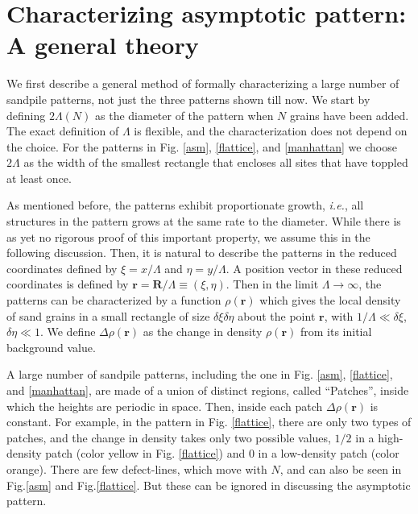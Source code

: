 \documentclass[11pt,a4paper]{book}
\begin{document}
\section{Characterizing asymptotic pattern: A general theory}
We first describe a general method of formally characterizing a
large number of sandpile patterns, not just the three patterns shown
till now.
We start by defining $2\Lambda\left( N \right)$ as the diameter of the
pattern when $N$ grains have been added. The exact definition of $\Lambda$ is flexible, and the
characterization does not depend on the choice. For the patterns in
Fig. \ref{asm}, \ref{flattice}, and \ref{manhattan} we choose $2\Lambda$ as the width of the
smallest rectangle that encloses all sites that have toppled at least
once.

As mentioned before, the patterns exhibit proportionate growth,
\textit{i.e.}, all structures in the pattern grows at the same rate to
the diameter. While there is as yet no rigorous proof of this
important property, we assume this in the following discussion. Then,
it is natural to describe the patterns in the reduced coordinates
defined by $\xi=x/\Lambda$ and $\eta=y/\Lambda$. A position
vector in these reduced coordinates is defined by $\mathbf{r}=\mathbf{R}/\Lambda\equiv\left( \xi, \eta \right)$.
Then in the limit $\Lambda\rightarrow\infty$, the patterns can be characterized by a
function $\rho(\mathbf{r})$ which gives the local density of sand
grains in a small rectangle of size $\delta\xi\delta\eta$
about the point $\mathbf{r}$, with $1/\Lambda\ll\delta\xi$, $\delta\eta\ll1$.
We define $\Delta\rho\left( \mathbf{r} \right)$ as the change in density $\rho\left( \mathbf{r} \right)$
from its initial background value.

A large number of sandpile patterns, including the one in Fig.
\ref{asm}, \ref{flattice}, and \ref{manhattan}, are made of a union of distinct regions,
called ``Patches'', inside which the heights are periodic in
space. Then, inside each patch $\Delta\rho\left( \mathbf{r} \right)$
is constant.  For example, in the pattern in Fig. \ref{flattice},
there are only two types of patches, and the
change in density takes only two possible values, $1/2$ in a high-density patch
(color yellow in Fig. \ref{flattice}) and $0$ in a low-density patch (color orange). There are 
few defect-lines, which move with $N$, and can also be seen in Fig.\ref{asm} and Fig.\ref{flattice}. 
But these can be ignored in discussing the asymptotic pattern.
\end{document}
